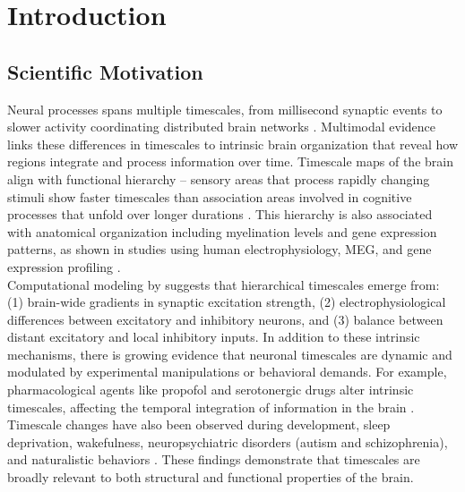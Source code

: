 \documentclass[latex/main.tex]{subfiles}
\begin{document}
\section{Introduction}

\subsection{Scientific Motivation} 
Neural processes spans multiple timescales, from millisecond synaptic events to slower activity coordinating distributed brain networks \citep{buzsaki_large-scale_2004}. Multimodal evidence links these differences in timescales to intrinsic brain organization that reveal how regions integrate and process information over time. Timescale maps of the brain align with functional hierarchy -- sensory areas that process rapidly changing stimuli show faster timescales than association areas involved in cognitive processes that unfold over longer durations \citep{raut_hierarchical_2020, gao_neuronal_2020, hasson_hierarchy_2008, murray_hierarchy_2014, stephens_place_2013}. This hierarchy is also associated with anatomical organization including myelination levels and gene expression patterns, as shown in studies using human electrophysiology, MEG, and gene expression profiling \citep{gao_neuronal_2020, shafiei_neurophysiological_2023}.\\

Computational modeling by \citet{li_hierarchical_2022} suggests that hierarchical timescales emerge from: (1) brain-wide gradients in synaptic excitation strength, (2) electrophysiological differences between excitatory and inhibitory neurons, and (3) balance between distant excitatory and local inhibitory inputs. In addition to these intrinsic mechanisms, there is growing evidence that neuronal timescales are dynamic and modulated by experimental manipulations or behavioral demands. For example, pharmacological agents like propofol and serotonergic drugs alter intrinsic timescales, affecting the temporal integration of information in the brain \citep{huang_timescales_2018, shinn_functional_2023}. Timescale changes have also been observed during development, sleep deprivation, wakefulness, neuropsychiatric disorders (autism and schizophrenia), and naturalistic behaviors \citep{martin-burgos_development_2024, meisel_decline_2017, watanabe_atypical_2019, wengler_distinct_2020, manea_neural_2024}. These findings demonstrate that timescales are broadly relevant to both structural and functional properties of the brain.\\
\end{document}
